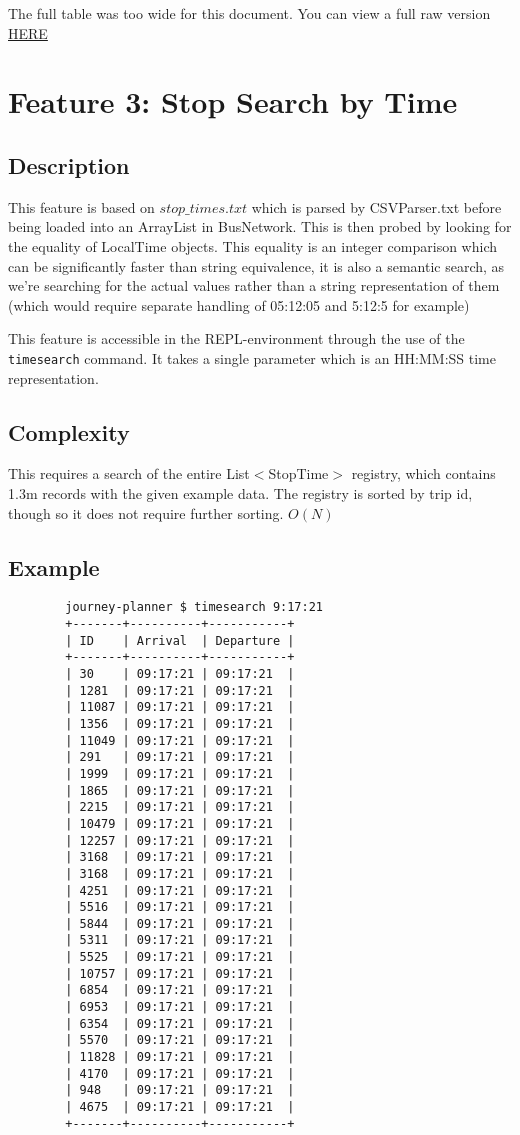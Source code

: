\documentclass[12pt]{report}
\begin{document}
	The full table was too wide for this document. You can view a full raw version \href{https://gist.githubusercontent.com/ParadauxIO/9c44111f89cfad4fe7df1f01a1305bde/raw/cd7e87f784e10381237592c35c16c89320322b6c/gistfile1.txt}{HERE}
	
	\section{Feature 3: Stop Search by Time}
	\subsection{Description}
	This feature is based on $stop\_times.txt$ which is parsed by CSVParser.txt before being loaded into an ArrayList in BusNetwork. This is then probed by looking for the equality of LocalTime objects. This equality is an integer comparison which can be significantly faster than string equivalence, it is also a semantic search, as we're searching for the actual values rather than a string representation of them (which would require separate handling of 05:12:05 and 5:12:5 for example) \newline
	
	This feature is accessible in the REPL-environment through the use of the \texttt{timesearch} command. It takes a single parameter which is an HH:MM:SS time representation. 
	
	\subsection{Complexity}
	This requires a search of the entire List$<$StopTime$>$  registry, which contains ~ 1.3m records with the given example data. The registry is sorted by trip id, though so it does not require further sorting. $O(N)$
	
	\subsection{Example}

	\begin{verbatim}
		journey-planner $ timesearch 9:17:21
		+-------+----------+-----------+
		| ID    | Arrival  | Departure |
		+-------+----------+-----------+
		| 30    | 09:17:21 | 09:17:21  |
		| 1281  | 09:17:21 | 09:17:21  |
		| 11087 | 09:17:21 | 09:17:21  |
		| 1356  | 09:17:21 | 09:17:21  |
		| 11049 | 09:17:21 | 09:17:21  |
		| 291   | 09:17:21 | 09:17:21  |
		| 1999  | 09:17:21 | 09:17:21  |
		| 1865  | 09:17:21 | 09:17:21  |
		| 2215  | 09:17:21 | 09:17:21  |
		| 10479 | 09:17:21 | 09:17:21  |
		| 12257 | 09:17:21 | 09:17:21  |
		| 3168  | 09:17:21 | 09:17:21  |
		| 3168  | 09:17:21 | 09:17:21  |
		| 4251  | 09:17:21 | 09:17:21  |
		| 5516  | 09:17:21 | 09:17:21  |
		| 5844  | 09:17:21 | 09:17:21  |
		| 5311  | 09:17:21 | 09:17:21  |
		| 5525  | 09:17:21 | 09:17:21  |
		| 10757 | 09:17:21 | 09:17:21  |
		| 6854  | 09:17:21 | 09:17:21  |
		| 6953  | 09:17:21 | 09:17:21  |
		| 6354  | 09:17:21 | 09:17:21  |
		| 5570  | 09:17:21 | 09:17:21  |
		| 11828 | 09:17:21 | 09:17:21  |
		| 4170  | 09:17:21 | 09:17:21  |
		| 948   | 09:17:21 | 09:17:21  |
		| 4675  | 09:17:21 | 09:17:21  |
		+-------+----------+-----------+
	\end{verbatim}		
\end{document}
